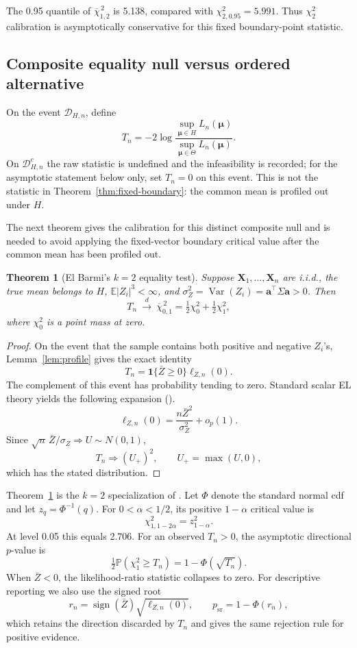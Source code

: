 \documentclass[11pt]{article}
\newtheorem{theorem}{Theorem}[section]
\theoremstyle{remark}
\newcommand{\E}{\mathbb{E}}
\newcommand{\Pp}{\mathbb{P}}
\newcommand{\barchi}[2]{\overline{\chi}^{\,2}_{#1,#2}}
\begin{document}
The 0.95 quantile of $\barchi{1}{2}$ is 5.138, compared with $\chi^2_{2,0.95}=5.991$.  Thus $\chi^2_2$ calibration is asymptotically conservative for this fixed boundary-point statistic.

\subsection{Composite equality null versus ordered alternative}

On the event $\mathcal D_{H,n}$, define
$$
  T_n
  =
  -2\log
  \frac{\sup_{\boldsymbol{\mu}\in H}L_n(\boldsymbol{\mu})}
       {\sup_{\boldsymbol{\mu}\in\Theta}L_n(\boldsymbol{\mu})}.
$$
On $\mathcal D_{H,n}^{c}$ the raw statistic is undefined and the infeasibility is recorded; for the asymptotic statement below only, set $T_n=0$ on this event.
This is not the statistic in Theorem~\ref{thm:fixed-boundary}: the common mean is profiled out under $H$.

The next theorem gives the calibration for this distinct composite null and is needed to avoid applying the fixed-vector boundary critical value after the common mean has been profiled out.

\begin{theorem}[El Barmi's $k=2$ equality test]\label{thm:composite}
Suppose $\boldsymbol{X}_1,\ldots,\boldsymbol{X}_n$ are i.i.d., the true mean belongs to $H$, $\E|Z_i|^3<\infty$, and $\sigma_Z^2=\operatorname{Var}(Z_i)=\boldsymbol{a}^\top\Sigma\boldsymbol{a}>0$. Then
$$
  T_n\ \xrightarrow{d}\ \barchi{0}{1}
  =
  \tfrac12\chi^2_0+\tfrac12\chi^2_1,
$$
where $\chi^2_0$ is a point mass at zero.
\end{theorem}

\begin{proof}
On the event that the sample contains both positive and negative $Z_i$'s, Lemma~\ref{lem:profile} gives the exact identity
$$
  T_n
  =
  \mathbf 1\{\bar Z\geq0\}\ell_{Z,n}(0).
$$
The complement of this event has probability tending to zero. Standard scalar EL theory yields the following expansion (\citet{owen1988empirical}). 
$$
  \ell_{Z,n}(0)
  =
  \frac{n\bar Z^2}{\sigma_Z^2}+o_{p}(1).
$$
Since $\sqrt n\,\bar Z/\sigma_Z\Rightarrow U\sim N(0,1)$,
$$
  T_n\Rightarrow (U_+)^2,\qquad U_+=\max(U,0),
$$
which has the stated distribution.
\end{proof}

Theorem~\ref{thm:composite} is the $k=2$ specialization of \citet[Theorem~3.2 and Example~2]{el1996empirical}. Let $\Phi$ denote the standard normal cdf and let $z_q=\Phi^{-1}(q)$. For $0<\alpha<1/2$, its positive $1-\alpha$ critical value is
$$
  \chi^2_{1,1-2\alpha}=z_{1-\alpha}^2.
$$
At level 0.05 this equals 2.706.  For an observed $T_n>0$, the asymptotic directional $p$-value is
$$
  \tfrac12\Pp(\chi^2_1\geq T_n)
  =
  1-\Phi(\sqrt{T_n}).
$$
When $\bar Z<0$, the likelihood-ratio statistic collapses to zero. For descriptive reporting we also use the signed root
$$
  r_n=\operatorname{sign}(\bar Z)\sqrt{\ell_{Z,n}(0)},
  \qquad p_{\mathrm{sr}}=1-\Phi(r_n),
$$
which retains the direction discarded by $T_n$ and gives the same rejection rule for positive evidence.
\end{document}
